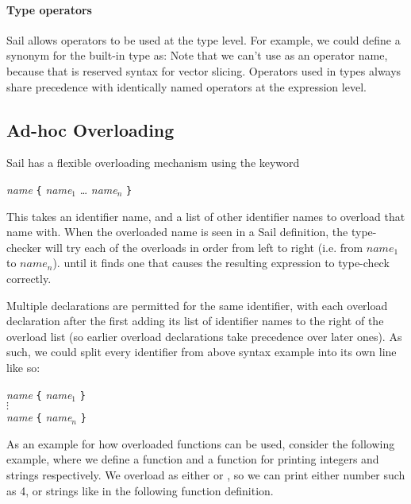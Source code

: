 \paragraph{Type operators}
Sail allows operators to be used at the type level. For example, we
could define a synonym for the built-in  type as:
 Note that we can't use
 as an operator name, because that is reserved syntax for
vector slicing. Operators used in types always share precedence with
identically named operators at the expression level.

\subsection{Ad-hoc Overloading}
\label{sec:overload}

Sail has a flexible overloading mechanism using the 
keyword
\begin{center}
   \textit{name} \ll{=} \lstinline+{+ \textit{name}$_1$ \ll{,} \ldots \ll{,} \textit{name}$_n$ \lstinline+}+
\end{center}
This takes an identifier name, and a list of other identifier names to
overload that name with. When the overloaded name is seen in a Sail
definition, the type-checker will try each of the overloads in order
from left to right (i.e. from $\textit{name}_1$ to $\textit{name}_n$).
until it finds one that causes the resulting expression to type-check
correctly.

Multiple  declarations are permitted for the same
identifier, with each overload declaration after the first adding its
list of identifier names to the right of the overload list (so earlier
overload declarations take precedence over later ones). As such, we
could split every identifier from above syntax example into its own
line like so:
\begin{center}
   \textit{name} \ll{=} \lstinline+{+ \textit{name}$_1$ \lstinline+}+\\
  $\vdots$\\
   \textit{name} \ll{=} \lstinline+{+ \textit{name}$_n$ \lstinline+}+
\end{center}

As an example for how overloaded functions can be used, consider the
following example, where we define a function  and a
function  for printing integers and strings
respectively. We overload  as either  or
, so we can print either number such as 4, or strings
like  in the following  function
definition.

